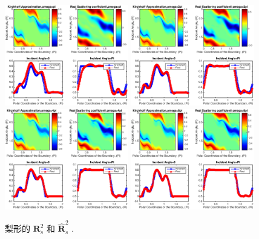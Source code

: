 {\begin{figure}[htbp]
	\centering
	\includegraphics[width=0.48\textwidth]{./Img/figure_sc_elastic/sc_s2_pear_1.eps}
	\includegraphics[width=0.48\textwidth]{./Img/figure_sc_elastic/sc_s2_pear_2.eps}
	\includegraphics[width=0.48\textwidth]{./Img/figure_sc_elastic/sc_s2_pear_4.eps}
	\includegraphics[width=0.48\textwidth]{./Img/figure_sc_elastic/sc_s2_pear_8.eps}		
	\caption{梨形的 $\mathbf{R}_s^2$ 和 $\hat {\mathbf{R}}_s^2$ .}\label{figure_9}
\end{figure}



}
